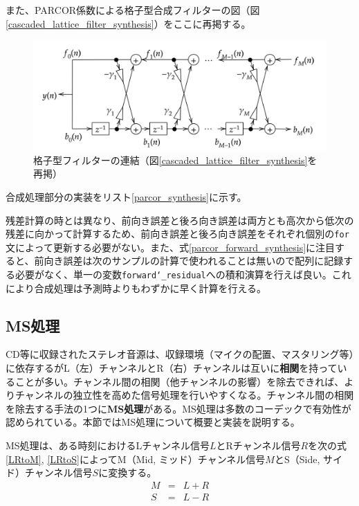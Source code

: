 \documentclass[uplatex,dvipdfmx,b5j,10pt]{jsbook}
\theoremstyle{definition}
\begin{document}
また、PARCOR係数による格子型合成フィルターの図（図\ref{cascaded_lattice_filter_synthesis}）をここに再掲する。
\begin{figure}[htbp]
  \begin{center}
    \includegraphics[width=120mm]{./figs/cascaded_lattice_filter_synthesis.png}
    \caption{格子型フィルターの連結（図\ref{cascaded_lattice_filter_synthesis}を再掲）}
  \end{center}
\end{figure}

合成処理部分の実装をリスト\ref{parcor_synthesis}に示す。


残差計算の時とは異なり、前向き誤差と後ろ向き誤差は両方とも高次から低次の残差に向かって計算するため、前向き誤差と後ろ向き誤差をそれぞれ個別の\texttt{for}文によって更新する必要がない。また、式\ref{parcor_forward_synthesis}に注目すると、前向き誤差は次のサンプルの計算で使われることは無いので配列に記録する必要がなく、単一の変数\texttt{forward\char`_residual}への積和演算を行えば良い。これにより合成処理は予測時よりもわずかに早く計算を行える。

\subsection{MS処理}

CD等に収録されたステレオ音源は、収録環境（マイクの配置、マスタリング等）に依存するがL（左）チャンネルとR（右）チャンネルは互いに\textbf{相関}を持っていることが多い。チャンネル間の相関（他チャンネルの影響）を除去できれば、よりチャンネルの独立性を高めた信号処理を行いやすくなる。チャンネル間の相関を除去する手法の1つに\textbf{MS処理}がある。MS処理は多数のコーデックで有効性が認められている\cite{wavpacktheory, flac}。本節ではMS処理について概要と実装を説明する。

MS処理は、ある時刻におけるLチャンネル信号$L$とRチャンネル信号$R$を次の式\ref{LRtoM}, \ref{LRtoS}によってM（Mid, ミッド）チャンネル信号$M$とS（Side, サイド）チャンネル信号$S$に変換する。
\begin{eqnarray}
  M &=& L + R \label{LRtoM} \\
  S &=& L - R \label{LRtoS}
\end{eqnarray}
\end{document}

